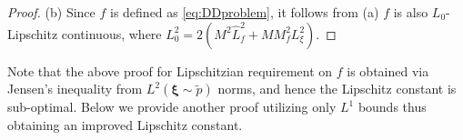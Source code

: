 \documentclass[11pt,reqno]{amsart}
\newcommand{\1}{{\bf 1}}
\newcommand{\2}{{\bf 2}}
\newcommand{\mr}[1]{{\color{blue}#1}}
\newcommand{\us}[1]{\textcolor{red}{#1}}
\newcommand{\bxi}{\boldsymbol{\xi}}
\newcommand{\E}{\mathbb E}
\newcommand{\lp}{\left(}
\newcommand{\rp}{\right)}
\newcommand{\lln}{\left|}
\newcommand{\rrn}{\right|}
\numberwithin{equation}{section}
\theoremstyle{remark}
\begin{document}
{{\begin{proof}
					\noindent (b) %
						Since $f$ is defined as \eqref{eq:DDproblem}, it follows from (a) $f$ is also $L_0$-Lipschitz continuous, where $L_0^2 = 2 {\lp M^2\hat{L}_f^2 + M M_f^2L_\xi^2 \rp}.$
						\end{proof}
						
						\medskip
						
						Note that the above proof for {Lipschitzian requirement on} $f$ is obtained {via} Jensen's inequality from $L^2(\bxi \sim \tilde{p})$ norms, and hence the Lipschitz constant is sub-optimal. Below we provide another proof utilizing only $L^1$ bounds thus obtaining an improved Lipschitz constant.
						
}}
\end{document}
